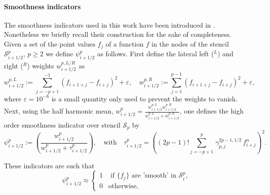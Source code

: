 \paragraph{Smoothness indicators}
The smoothness indicators used in this work  have been introduced in \cite{CPZMR2020}. Nonetheless we briefly recall their construction for the sake of completeness. 
Given a set of the point values $f_j$ of a function $f$ in  the nodes of the stencil $\mathcal{S}^p_{i+1/2}$, $p \geq 2$ we define $\psi_{i+1/2}^p$ as follows. 
First define the lateral left ($^L$) and right ($^R$) weights $w_{i + 1/2}^{p,L/R}$ as
\begin{equation}
        w_{i+1/2}^{p,L}:=\sum_{j=-p+1}^{-1}(f_{i+1+j}-f_{i+j})^2+\varepsilon,\quad
        w_{i + 1/2}^{p,R}:=\sum_{j=1}^{p-1}(f_{i+1+j}-f_{i+j})^2+\varepsilon,
\end{equation}	
where $\varepsilon=10^{-8}$ is a small quantity only used to prevent the weights to vanish. 
Next, using the half harmonic mean,
$w_{i + 1/2}^p = \frac{w_{i + 1/2}^{p,L} w_{i +1/2}^{p,R}}{w_{i + 1/2}^{p,L}+w_{i+1/2}^{p,R}}$,
one defines the high order smoothness indicator over stencil $\mathcal{S}_p$ by 
\begin{equation}\label{indicadores_locales}
        \psi_{i+1/2}^p:=\left( \frac{w_{i + 1/2}^p}{w_{i + 1/2}^p+\tau_{i + 1/2}^p}\right),   
\quad
\text{with}
\quad
\tau_{i + 1/2}^p = \left( (2p - 1)! \sum^{p}_{j=-p+1}\,\gamma^{2p-1, 1/2}_{p,j} \, f^n_{i+j} \right)^2. 
\end{equation}

These indicators are such that
\begin{equation}\label{condiconesS}
    \psi^p_{i+1/2} \approx \left\{
    \begin{array}{cl}
    1 & \mbox { if $\{f_j\}$ are 'smooth' in $\mathcal{S}^p_i$},\\
    0 & \mbox {otherwise}, 
    \end{array}\right.
\end{equation}
